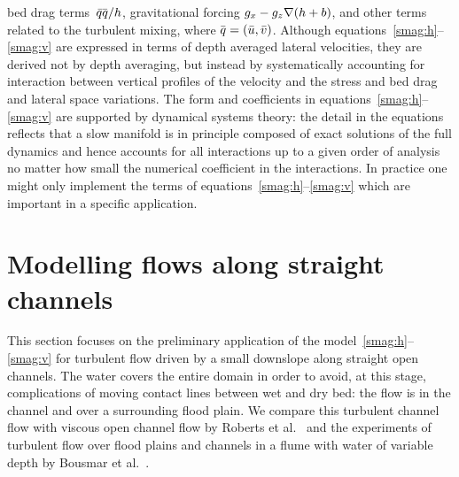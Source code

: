 \documentclass[a5paper,12pt]{article}
\newcommand{\uu}{{\bar u}}
\newcommand{\vv}{{\bar v}}
\newcommand{\bq}{{\bar q}}
\newcommand{\qq}{{\bar{\vec q}}}
\renewcommand{\vec}[1]{\text{\boldmath$#1$}}
\begin{document}
bed drag terms~$\bq{\qq}/{h}$, gravitational forcing $g_x-g_z{\grad(h+b)}$, and other terms related to the turbulent mixing, where $\qq=(\uu,\vv)$. 
Although equations~\eqref{smag:h}--\eqref{smag:v} are expressed in terms of depth averaged lateral velocities, they are derived not by depth averaging, but instead by systematically accounting for interaction between vertical profiles of the velocity and the stress and bed drag and lateral space variations. 
The form and coefficients in equations~\eqref{smag:h}--\eqref{smag:v} are supported by dynamical systems theory: the detail in the equations reflects that a slow manifold is in principle composed of exact solutions of the full dynamics and hence accounts for all interactions up to a given order of analysis no matter how small the numerical coefficient in the interactions.
In practice one might only implement the terms of equations~\eqref{smag:h}--\eqref{smag:v} which are important in a specific application.

\section{Modelling flows along straight channels}




This section focuses on the preliminary application of the model~\eqref{smag:h}--\eqref{smag:v} for turbulent flow driven by a small downslope along straight open channels.
The water covers the entire domain in order to avoid, at this stage, complications of moving contact lines between wet and dry bed: the flow is in the channel and over a surrounding flood plain.
We compare this turbulent channel flow with viscous open channel flow by Roberts et al.~\cite{Robertsli2006} and the experiments of turbulent flow over flood plains and channels in a flume with water of variable depth by Bousmar et al.~\cite{Bousmar2002,Bousmar2003a}.
\end{document}
